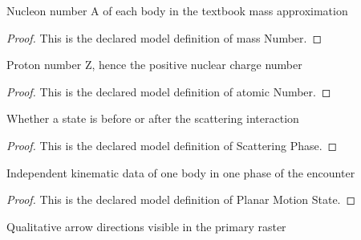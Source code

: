 \begin{definition}
  \label{def:physics:phyx-mini-0641:phyxminiproblems-problemphyxmini0641-scatteringbody-massnumber}
  Nucleon number A of each body in the textbook mass approximation
\end{definition}
\begin{proof}
  This is the declared model definition of mass Number.
\end{proof}
\begin{definition}
  \label{def:physics:phyx-mini-0641:phyxminiproblems-problemphyxmini0641-scatteringbody-atomicnumber}
  Proton number Z, hence the positive nuclear charge number
\end{definition}
\begin{proof}
  This is the declared model definition of atomic Number.
\end{proof}
\begin{definition}
  \label{def:physics:phyx-mini-0641:phyxminiproblems-problemphyxmini0641-scatteringphase}
  Whether a state is before or after the scattering interaction
\end{definition}
\begin{proof}
  This is the declared model definition of Scattering Phase.
\end{proof}
\begin{definition}
  \label{def:physics:phyx-mini-0641:phyxminiproblems-problemphyxmini0641-planarmotionstate}
  Independent kinematic data of one body in one phase of the encounter
\end{definition}
\begin{proof}
  This is the declared model definition of Planar Motion State.
\end{proof}
\begin{definition}
  \label{def:physics:phyx-mini-0641:phyxminiproblems-problemphyxmini0641-planardirection}
  Qualitative arrow directions visible in the primary raster
\end{definition}
